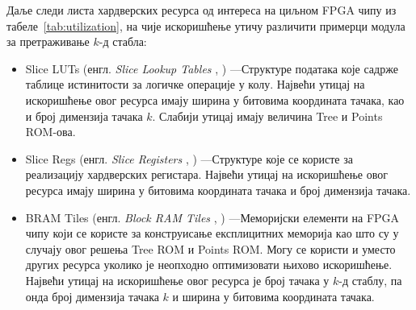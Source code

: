 \documentclass[master]{finthesis}
\makeatletter
\newcommand*{\engl}[2][\@empty]{%
    \edef\theacronym{#1}%
    (енгл. \foreignlanguage{english}{\emph{#2}%
    \ifx\theacronym\@empty \else , #1\fi})%
}
\newcommand*{\kd}{\texorpdfstring{$k$}{k}-д }
\makeatother
\begin{document}
Даље следи листа хардверских ресурса од интереса на циљном FPGA чипу из табеле~\ref{tab:utilization}, на чије искоришћење утичу различити примерци модула за претраживање \kd стабла:
\begin{itemize}
    \item Slice LUTs \engl{Slice Lookup Tables}---Структуре података које садрже таблице истинитости за логичке операције у колу. Највећи утицај на искоришћење овог ресурса имају ширина у битовима координата тачака, као и број димензија тачака $k$. Слабији утицај имају величина Tree и Points ROM-ова.
    \item Slice Regs \engl{Slice Registers}---Структуре које се користе за реализацију хардверских регистара. Највећи утицај на искоришћење овог ресурса имају ширина у битовима координата тачака и број димензија тачака.
    \item BRAM Tiles \engl{Block RAM Tiles}---Меморијски елементи на FPGA чипу који се користе за конструисање експлицитних меморија као што су у случају овог решења Tree ROM и Points ROM. Могу се користи и уместо других ресурса уколико је неопходно оптимизовати њихово искоришћење. Највећи утицај на искоришћење овог ресурса је број тачака у \kd стаблу, па онда број димензија тачака $k$ и ширина у битовима координата тачака.


\end{itemize}
\end{document}
